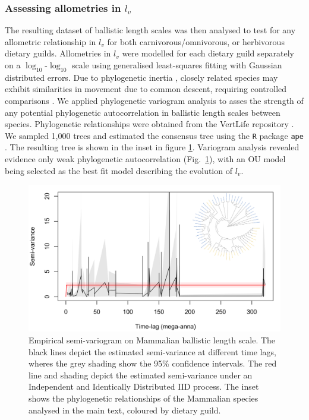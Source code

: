 \documentclass[12pt]{article}
\begin{document}
\subsubsection*{Assessing allometries in $l_v$}

The resulting dataset of ballistic length scales was then analysed to test for any allometric relationship in $l_v$ for both carnivorous/omnivorous, or herbivorous dietary guilds. Allometries in $l_v$ were modelled for each dietary guild separately on a $\log_{10}$-$\log_{10}$ scale using generalised least-squares fitting with Gaussian distributed errors. Due to phylogenetic inertia \cite{Hansen:2005cg}, closely related species may exhibit similarities in movement due to common descent, requiring controlled comparisons \cite{Harvey:1991uo}. We applied phylogenetic variogram analysis \cite{Noonan:2022} to asses the strength of any potential phylogenetic autocorrelation in ballistic length scales between species. Phylogenetic relationships were obtained from the VertLife repository \cite{Upham:2019}. We sampled 1,000 trees and estimated the consensus tree using the \texttt{R} package \texttt{ape} \cite{ape}. The resulting tree is shown in the inset in figure \ref{fig:SVF}. Variogram analysis revealed evidence only weak phylogenetic autocorrelation (Fig.~\ref{fig:SVF}), with an OU model being selected as the best fit model describing the evolution of $l_v$.


\begin{figure}[!h]
\centering
\includegraphics[scale=1]{Ballistic_Motion_SVF.png}
\caption{Empirical semi-variogram on Mammalian ballistic length scale. The black lines depict the estimated semi-variance at different time lags, wheres the grey shading show the 95\% confidence intervals. The red line and shading depict the estimated semi-variance under an Independent and Identically Distributed IID process. The inset shows the phylogenetic relationships of the Mammalian species analysed in the main text, coloured by dietary guild.}
\label{fig:SVF}
\end{figure}
\end{document}

